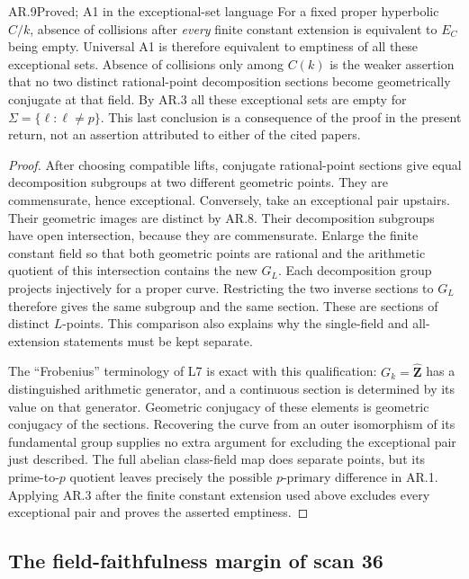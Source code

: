 \begin{claim}{AR.9}{Proved; A1 in the exceptional-set language}
For a fixed proper hyperbolic $C/k$, absence of collisions after
\emph{every} finite constant extension is equivalent to $E_C$ being
empty.  Universal A1 is therefore equivalent to emptiness of all these
exceptional sets.  Absence of collisions only among $C(k)$ is the
weaker assertion that no two distinct rational-point decomposition
sections become geometrically conjugate at that field.
By AR.3 all these exceptional sets are empty for
$\Sigma=\{\ell:\ell\ne p\}$.  This last conclusion is a consequence
of the proof in the present return, not an assertion attributed to
either of the cited papers.
\end{claim}
\begin{proof}
After choosing compatible lifts, conjugate rational-point sections give
equal decomposition subgroups at two different geometric points.
They are commensurate, hence exceptional.  Conversely, take an
exceptional pair upstairs.  Their geometric images are distinct by
AR.8.  Their decomposition subgroups have open intersection, because
they are commensurate.  Enlarge the finite constant field so that both
geometric points are rational and the arithmetic quotient of this
intersection contains the new $G_L$.  Each decomposition group
projects injectively for a proper curve.  Restricting the two inverse
sections to $G_L$ therefore gives the same subgroup and the same
section.  These are sections of distinct $L$-points.  This comparison
also explains why the single-field and all-extension statements must
be kept separate.

The ``Frobenius'' terminology of L7 is exact with this qualification:
$G_k=\widehat{\mathbf Z}$ has a distinguished arithmetic generator,
and a continuous section is determined by its value on that generator.
Geometric conjugacy of these elements is geometric conjugacy of the
sections.  Recovering the curve from an outer isomorphism of its
fundamental group supplies no extra argument for excluding the
exceptional pair just described.  The full abelian class-field map
does separate points, but its prime-to-$p$ quotient leaves precisely
the possible $p$-primary difference in AR.1.
Applying AR.3 after the finite constant extension used above excludes
every exceptional pair and proves the asserted emptiness.
\end{proof}

\subsection{The field-faithfulness margin of scan 36}

